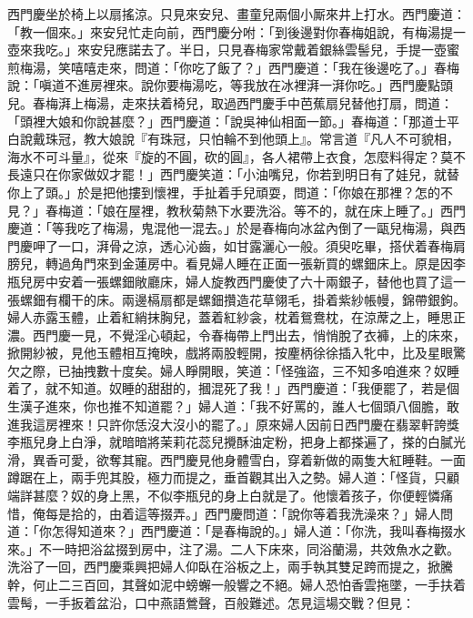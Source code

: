 西門慶坐於椅上以扇搖涼。只見來安兒、畫童兒兩個小厮來井上打水。西門慶道：「教一個來。」來安兒忙走向前，西門慶分咐：「到後邊對你春梅姐說，有梅湯提一壺來我吃。」來安兒應諾去了。半日，只見春梅家常戴着銀絲雲髻兒，手提一壺蜜煎梅湯，笑嘻嘻走來，{}問道：「你吃了飯了？」西門慶道：「我在後邊吃了。」春梅說：「嗔道不進房裡來。說你要梅湯吃，等我放在冰裡湃一湃你吃。」{}西門慶點頭兒。春梅湃上梅湯，走來扶着椅兒，取過西門慶手中芭蕉扇兒替他打扇，{}問道：「頭裡大娘和你說甚麼？」{}西門慶道：「說吳神仙相面一節。」春梅道：「那道士平白說戴珠冠，教大娘說『有珠冠，只怕輪不到他頭上』。常言道『凡人不可貌相，海水不可斗量』，從來『旋的不圓，砍的圓』，各人裙帶上衣食，怎麼料得定？莫不長遠只在你家做奴才罷！」{}{}西門慶笑道：「小油嘴兒，你若到明日有了娃兒，就替你上了頭。」於是把他摟到懷裡，手扯着手兒頑耍，問道：「你娘在那裡？怎的不見？」春梅道：「娘在屋裡，教秋菊熱下水要洗浴。等不的，就在床上睡了。」西門慶道：「等我吃了梅湯，鬼混他一混去。」於是春梅向冰盆內倒了一甌兒梅湯，與西門慶呷了一口，湃骨之涼，透心沁齒，如甘露灑心一般。須臾吃畢，搭伏着春梅肩膀兒，轉過角門來到金蓮房中。看見婦人睡在正面一張新買的螺鈿床上。原是因李瓶兒房中安着一張螺鈿敞廳床，婦人旋教西門慶使了六十兩銀子，替他也買了這一張螺鈿有欄干的床。兩邊槅扇都是螺鈿攢造花草翎毛，掛着紫紗帳幔，錦帶銀鉤。婦人赤露玉體，止着紅綃抹胸兒，{}蓋着紅紗衾，枕着鴛鴦枕，在涼蓆之上，睡思正濃。西門慶一見，不覺淫心頓起，令春梅帶上門出去，悄悄脫了衣褲，上的床來，掀開紗被，見他玉體相互掩映，戲將兩股輕開，按麈柄徐徐插入牝中，比及星眼驚欠之際，已抽拽數十度矣。婦人睜開眼，笑道：「怪強盜，三不知多咱進來？奴睡着了，就不知道。奴睡的甜甜的，摑混死了我！」{}西門慶道：「我便罷了，若是個生漢子進來，你也推不知道罷？」{}婦人道：「我不好罵的，誰人七個頭八個膽，敢進我這房裡來！只許你恁沒大沒小的罷了。」原來婦人因前日西門慶在翡翠軒誇獎李瓶兒身上白淨，就暗暗將茉莉花蕊兒攪酥油定粉，把身上都搽遍了，{}搽的白膩光滑，異香可愛，欲奪其寵。西門慶見他身體雪白，穿着新做的兩隻大紅睡鞋。一面蹲踞在上，兩手兜其股，極力而提之，垂首觀其出入之勢。婦人道：「怪貨，只顧端詳甚麼？奴的身上黑，不似李瓶兒的身上白就是了。他懷着孩子，你便輕憐痛惜，俺每是拾的，由着這等掇弄。」{}西門慶問道：「說你等着我洗澡來？」婦人問道：「你怎得知道來？」西門慶道：「是春梅說的。」婦人道：「你洗，我叫春梅掇水來。」不一時把浴盆掇到房中，注了湯。二人下床來，同浴蘭湯，共效魚水之歡。洗浴了一回，西門慶乘興把婦人仰臥在浴板之上，兩手執其雙足跨而提之，掀騰𢵞幹，何止二三百回，其聲如泥中螃蠏一般響之不絕。婦人恐怕香雲拖墜，一手扶着雲髩，{}一手扳着盆沿，口中燕語鶯聲，百般難述。{}怎見這場交戰？但見：

